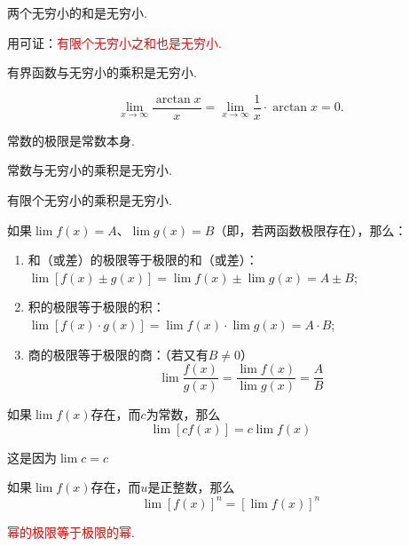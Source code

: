 \begin{theorem}
	两个无穷小的和是无穷小.
\end{theorem}

\begin{note}
	用可证：\textcolor{red}{有限个无穷小之和也是无穷小}.
\end{note}

\begin{theorem}
	有界函数与无穷小的乘积是无穷小.
\end{theorem}
\begin{example}
	\[ \lim\limits_{x \to \infty}\dfrac{\arctan x}{x} = \lim\limits_{x \to \infty}\dfrac{1}{x} \cdot \arctan x = 0. \]
\end{example}

\begin{note}
	常数的极限是常数本身.
\end{note}

\begin{corollary}
	常数与无穷小的乘积是无穷小.
\end{corollary}

\begin{corollary}
	有限个无穷小的乘积是无穷小.
\end{corollary}

\begin{theorem}
	如果\( \lim f(x) = A \)、\( \lim g(x) = B \)（即，若两函数极限存在），那么：
	\begin{enumerate}
		\item 和（或差）的极限等于极限的和（或差）：\( \lim [f(x) \pm g(x)] = \lim f(x) \pm \lim g(x) = A \pm B \);
		\item 积的极限等于极限的积：\( \lim [f(x) \cdot g(x)] = \lim f(x) \cdot \lim g(x) = A \cdot B \);
		\item 商的极限等于极限的商：（若又有\( B \neq 0 \)）
		\[ \lim \dfrac{f(x)}{g(x)} = \dfrac{\lim f(x)}{\lim g(x)} = \dfrac{A}{B} \]
	\end{enumerate}
\end{theorem}

\begin{corollary}
	如果\( \lim f(x) \)存在，而\( c \)为常数，那么
	\[ \lim [cf(x)] = c\lim f(x) \]
\end{corollary}
\begin{note}
	这是因为\( \lim c = c \)
\end{note}

\begin{corollary}
	如果\( \lim f(x) \)存在，而\( u \)是正整数，那么
	\[ \lim [f(x)]^{n} = [\lim f(x)]^{n} \]
\end{corollary}
\begin{note}
	\textcolor{red}{幂的极限等于极限的幂}.
\end{note}

